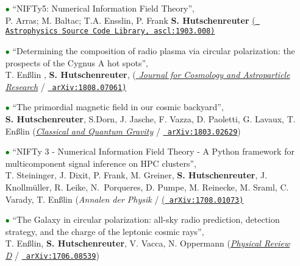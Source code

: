 \begin{itemize}
\vspace{6pt}

\item[\textcolor{Green}{$\bullet$}]{``NIFTy5: Numerical Information Field Theory'', \\P. Arras; M. Baltac; T.A. Ensslin, P. Frank \textbf{S. Hutschenreuter} \href{http://ascl.net/1903.008}{(\texttt{{\color{blue} Astrophysics Source Code Library, ascl:1903.008})}}}

\vspace{6pt}

\item[\textcolor{Green}{$\bullet$}]{``Determining the composition of radio plasma via circular polarization: the prospects of the Cygnus A hot spots'', \\ 
T. En{\ss}lin , \textbf{S. Hutschenreuter},  ({\color{blue}\href{https://iopscience.iop.org/article/10.1088/1475-7516/2019/01/035/meta}{ \textit{Journal for Cosmology and Astroparticle Research}} / 
\href{https://arxiv.org/abs/1808.07061}{\texttt{{\color{blue} arXiv:1808.07061})}}}}

\vspace{6pt}

\item[\textcolor{Green}{$\bullet$}]{``The primordial magnetic field in our cosmic backyard'', \\
\textbf{S. Hutschenreuter}, S.Dorn, J. Jasche, F. Vazza, D. Paoletti, G. Lavaux, T. En{\ss}lin (\href{https://iopscience.iop.org/article/10.1088/1361-6382/aacde0}{\color{blue}\textit{Classical and Quantum Gravity}} / \href{https://arxiv.org/abs/1803.02629}{\texttt{{\color{blue} arXiv:1803.02629}}})}

\vspace{6pt}

\item[\textcolor{Green}{$\bullet$}]{``NIFTy 3 - Numerical Information Field Theory - A Python framework for multicomponent signal inference on HPC clusters'', \\
T. Steininger, J. Dixit, P. Frank, M. Greiner, \textbf{S. Hutschenreuter}, J. Knollm{\"u}ller, R. Leike, N.~Porqueres, D. Pumpe, M. Reinecke, M. Sraml, C. Varady, T. En{\ss}lin ({\color{blue}\textit{Annalen der Physik}} / \href{https://arxiv.org/abs/1708.01073}{(\texttt{{\color{blue} arXiv:1708.01073})}}}

\vspace{6pt}

\item[\textcolor{Green}{$\bullet$}]{``The Galaxy in circular polarization: all-sky radio prediction, detection strategy, and the charge of the leptonic cosmic rays'', \\ T. En{\ss}lin,  \textbf{S. Hutschenreuter}, V. Vacca, N. Oppermann   (\href{https://journals.aps.org/prd/abstract/10.1103/PhysRevD.96.043021}{\color{blue}\textit{Physical Review D}} / \href{https://arxiv.org/abs/1706.08539}{\texttt{{\color{blue} arXiv:1706.08539}}})}
\end{itemize}